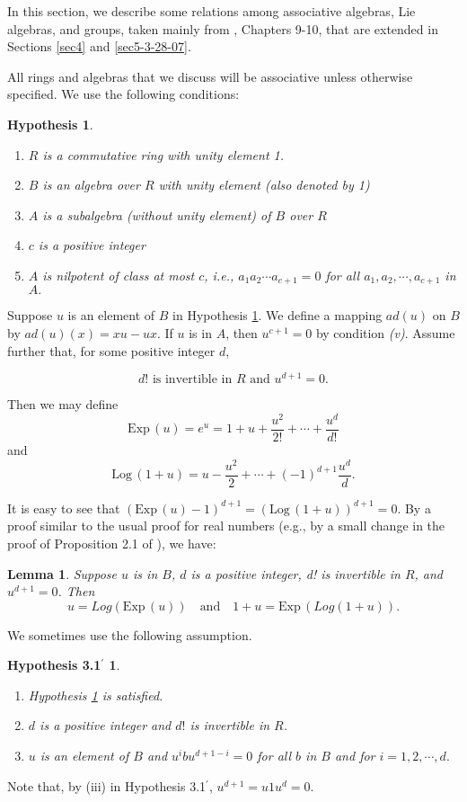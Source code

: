 \documentclass[mathscr]{amsart}
\theoremstyle{theorem}
\newtheorem{lemma}[theorem]{Lemma}
\newtheorem{hypothesis}[theorem]{Hypothesis}
\newtheorem*{hypothesis2.1'}{Hypothesis 3.1$^\prime$}
\theoremstyle{definition}
\numberwithin{equation}{section}
\def \({\left(}
\def \){\right)}
\def \Exp{\text{Exp}\,}
\def \Log{\text{Log}\,}
\begin{document}
In this section, we describe some relations among associative
algebras, Lie algebras, and groups, taken mainly from \cite{Kh},
Chapters 9-10, that are extended in Sections \ref{sec4} and
\ref{sec5-3-28-07}.

All rings and algebras that we discuss will be associative unless
otherwise specified. We use the following conditions:

\begin{hypothesis}\label{2.1}
\begin{enumerate}
\item[(i)] $R$ is a commutative ring with unity element 1.
\item[(ii)] $B$ is an algebra over $R$ with unity element (also denoted by 1)
\item[(iii)] $A$ is a subalgebra (without unity element) of $B$ over $R$
\item[(iv)] $c$ is a positive integer
\item[(v)] $A$ is nilpotent of class at most $c$, i.e.,
$a_1a_2\cdots a_{c+1}=0$ for all $a_1, a_2, \cdots, a_{c+1}$ in $A.$
\end{enumerate}
\end{hypothesis}

Suppose $u$ is an element of $B$ in Hypothesis \ref{2.1}. We define
a mapping $ad(u)$ on $B$ by $ad(u)(x)=xu-ux.$ If $u$ is in $A$, then
$u^{c+1}=0$ by condition {\it (v)}. Assume further that, for some
positive integer $d$,

\begin{equation}\label{eq3.1}
d!\text{ is invertible in }R \text{ and }u^{d+1}=0.
\end{equation}

Then we may define
$$\Exp(u)=e^{u}=1+u+\frac{u^2}{2!}+\cdots+\frac{u^d}{d!}$$
and
$$\Log(1+u)=u-\frac{u^2}{2}+\cdots+(-1)^{d+1}\frac{u^d}{d}.$$

It is easy to see that $\(\Exp(u)-1\)^{d+1}=\(\Log(1+u)\)^{d+1}=0.$
By a proof similar to the usual proof for real numbers (e.g., by a
small change in the proof of Proposition 2.1 of \cite{JAGG}), we
have:

\begin{lemma}\label{lemma2.2}
Suppose $u$ is in $B$, $d$ is a positive integer, d! is invertible
in $R$, and $u^{d+1}=0$. Then
$$u=Log(\Exp(u))\quad\text{and}\quad 1+u=\Exp(Log(1+u)).$$
\end{lemma}

We sometimes use the following assumption.

\begin{hypothesis2.1'}\label{2.1'}
\begin{enumerate}
\item[(i)] Hypothesis \ref{2.1} is satisfied.
\item[(ii)] $d$ is a positive integer and $d!$ is invertible in $R$.
\item[(iii)] $u$ is an element of $B$ and $u^ibu^{d+1-i}=0$ for all $b$ in $B$ and for $i=1,2, \cdots, d.$
\end{enumerate}
\end{hypothesis2.1'}
Note that, by (iii) in Hypothesis 3.1$^\prime$, $u^{d+1}=u1u^d=0.$
\end{document}
